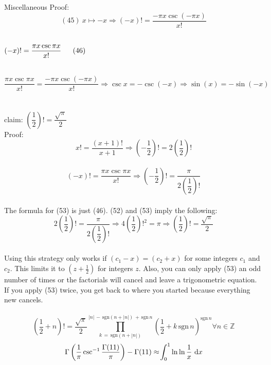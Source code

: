 \documentclass[12pt]{article}
\begin{document}
\begin{section}{Miscellaneous}
	Proof:\\
	\begin{equation}
		(45)~x\mapsto-x\Longrightarrow(-x)!=\dfrac{-\pi x\csc(-\pi x)}{x!}
	\end{equation}\\ %
	\centerline{$(-x)!=\dfrac{\pi x\csc\pi x}{x!}\hspace{1.6em}(46)$}\\
	\begin{equation}
		\dfrac{\pi x\csc\pi x}{x!}=\dfrac{-\pi x\csc(-\pi x)}{x!}\Longrightarrow
		\csc x=-\csc(-x)\Longrightarrow\sin(x)=-\sin(-x)
	\end{equation}\\ %
	\blacksquare\\

	\noindent claim: $\left(\dfrac12\right)!=\dfrac{\sqrt\pi}2$\\
	Proof:\\
	\begin{equation}
		x!=\dfrac{(x+1)!}{x+1}\Longrightarrow\left(-\dfrac12\right)!=2\left(\dfrac12\right)!
	\end{equation}\\ %
	\begin{equation}
		(-x)!=\dfrac{\pi x\csc\pi x}{x!}\Longrightarrow\left(-\dfrac12\right)!=
		\dfrac\pi{2\left(\dfrac12\right)!}
	\end{equation}\\ %
	The formula for (53) is just (46). (52) and (53) imply the following:\\
	\begin{equation}
		2\left(\dfrac12\right)!=\dfrac\pi{2\left(\dfrac12\right)!}\Longrightarrow
		4\left(\dfrac12\right)!^2=\pi\Longrightarrow\left(\dfrac12\right)!=\dfrac{\sqrt\pi}2
	\end{equation}\\ %
	Using this strategy only works if $(c_1-x)=(c_2+x)$ for some integers $c_1$ and $c_2$. This
	limits it to $(z+\frac12)$ for integers $z$. Also, you can only apply (53) an odd number of
	times or the factorials will cancel and leave a trigonometric equation. If you apply (53)
	twice, you get back to where you started because everything new cancels.\\
	\blacksquare\\

	\noindent\begin{equation}
		\left(\dfrac12+n\right)!=\dfrac{\sqrt\pi}2\prod_{k\,=\,\text{sgn}\left(n+\left|n\right|
		\right)}^{\left|n\right|\,-\,\text{sgn}\left(n+\left|n\right|\right)\,+\,\text{sgn}\,n}
		\left(\dfrac12+k\,\text{sgn}\,n\right)^{\text{sgn}\,n}\forall n\in\mathbb Z
	\end{equation} %
	\pagebreak\begin{equation}
		\Gamma\left(\dfrac1\pi\csc^{-1}\dfrac{\Gamma(11)}\pi\right)-\Gamma(11)\approx
		\!\int_0^1\ln\ln\frac1x~\text dx
	\end{equation}


\end{section}
\end{document}
